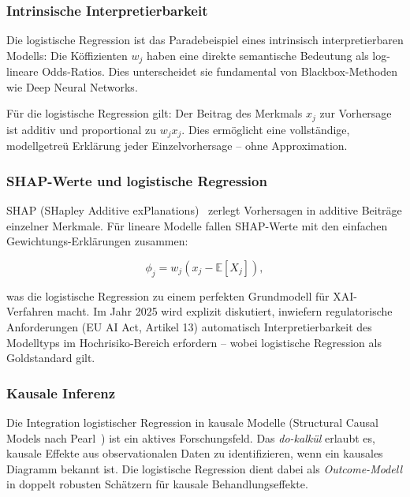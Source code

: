 ﻿\documentclass[12pt, a4paper]{article}
\theoremstyle{definition}
\theoremstyle{remark}
\newcommand{\E}{\mathbb{E}}
\begin{document}
\subsubsection{Intrinsische Interpretierbarkeit}

Die logistische Regression ist das Paradebeispiel eines intrinsisch interpretierbaren Modells:
Die Köffizienten $w_j$ haben eine direkte semantische Bedeutung als log-lineare Odds-Ratios.
Dies unterscheidet sie fundamental von Blackbox-Methoden wie Deep Neural Networks.

\begin{tcolorbox}[notebox, title={Interpretierbarkeitsgarantie}]
  Für die logistische Regression gilt: Der Beitrag des Merkmals $x_j$ zur Vorhersage
  ist additiv und proportional zu $w_j x_j$. Dies ermöglicht eine vollständige, modellgetreü
  Erklärung jeder Einzelvorhersage -- ohne Approximation.
\end{tcolorbox}

\subsubsection{SHAP-Werte und logistische Regression}

SHAP (SHapley Additive exPlanations)~\citep{lundberg2017unified} zerlegt Vorhersagen in
additive Beiträge einzelner Merkmale. Für lineare Modelle fallen SHAP-Werte mit den
einfachen Gewichtungs-Erklärungen zusammen:

\begin{equation}
  \phi_j = w_j(x_j - \E[X_j]),
  \label{eq:shap_linear}
\end{equation}

was die logistische Regression zu einem perfekten Grundmodell für XAI-Verfahren macht.
Im Jahr 2025 wird explizit diskutiert, inwiefern regulatorische Anforderungen (EU AI Act,
Artikel 13) automatisch Interpretierbarkeit des Modelltyps im Hochrisiko-Bereich erfordern
-- wobei logistische Regression als Goldstandard gilt.

\subsubsection{Kausale Inferenz}

Die Integration logistischer Regression in kausale Modelle (Structural Causal Models nach
Pearl~\citep{pearl2009causality}) ist ein aktives Forschungsfeld. Das \emph{do-kalkül}
erlaubt es, kausale Effekte aus observationalen Daten zu identifizieren, wenn ein kausales
Diagramm bekannt ist. Die logistische Regression dient dabei als \emph{Outcome-Modell} in
doppelt robusten Schätzern für kausale Behandlungseffekte.
\end{document}

